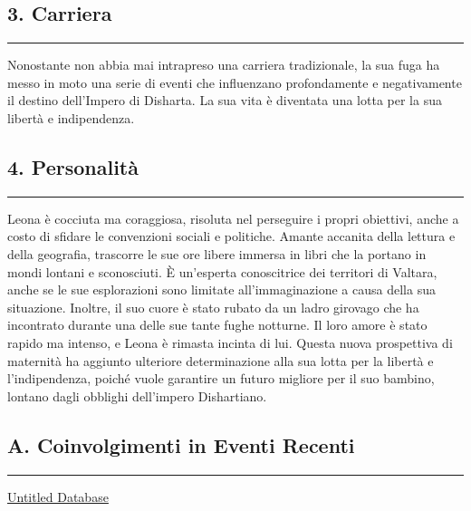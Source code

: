 \subsection{3. Carriera}\label{carriera}

\begin{center}\rule{0.5\linewidth}{0.5pt}\end{center}

Nonostante non abbia mai intrapreso una carriera tradizionale, la sua
fuga ha messo in moto una serie di eventi che influenzano profondamente
e negativamente il destino dell'Impero di Disharta. La sua vita è
diventata una lotta per la sua libertà e indipendenza.

\subsection{4. Personalità}\label{personalituxe0}

\begin{center}\rule{0.5\linewidth}{0.5pt}\end{center}

Leona è cocciuta ma coraggiosa, risoluta nel perseguire i propri
obiettivi, anche a costo di sfidare le convenzioni sociali e politiche.
Amante accanita della lettura e della geografia, trascorre le sue ore
libere immersa in libri che la portano in mondi lontani e sconosciuti. È
un'esperta conoscitrice dei territori di Valtara, anche se le sue
esplorazioni sono limitate all'immaginazione a causa della sua
situazione. Inoltre, il suo cuore è stato rubato da un ladro girovago
che ha incontrato durante una delle sue tante fughe notturne. Il loro
amore è stato rapido ma intenso, e Leona è rimasta incinta di lui.
Questa nuova prospettiva di maternità ha aggiunto ulteriore
determinazione alla sua lotta per la libertà e l'indipendenza, poiché
vuole garantire un futuro migliore per il suo bambino, lontano dagli
obblighi dell'impero Dishartiano.

\subsection{A. Coinvolgimenti in Eventi
Recenti}\label{a.-coinvolgimenti-in-eventi-recenti}

\begin{center}\rule{0.5\linewidth}{0.5pt}\end{center}

\href{Untitled\%20Database\%203437f651bc3346468e1534d3b16d20e1.csv}{Untitled
Database}
